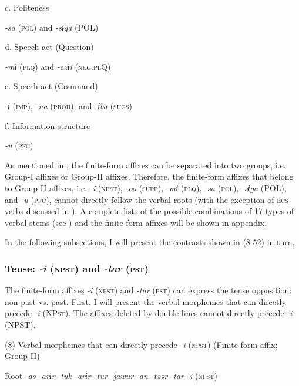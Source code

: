   c.  Politeness

    \textit{{}-sa} (\textsc{pol}) and \textit{{}-sɨga} (POL)

  d.  Speech act (Question)

    \textit{{}-mɨ} (\textsc{plq}) and \textit{{}-azɨi} (\textsc{neg}.\textsc{pl}Q)

  e.  Speech act (Command)

    \textit{{}-ɨ} (\textsc{imp}), \textit{{}-na} (\textsc{proh}), and \textit{{}-ɨba} (\textsc{sugs})

  f.  Information structure

    \textit{{}-u} (\textsc{pfc})

As mentioned in , the finite-form affixes can be separated into two groups, i.e. Group-I affixes or Group-II affixes. Therefore, the finite-form affixes that belong to Group-II affixes, i.e. \textit{{}-i} (\textsc{npst}), \textit{{}-oo} (\textsc{supp}), \textit{{}-mɨ} (\textsc{plq}), \textit{{}-sa} (\textsc{pol}), \textit{{}-sɨga} (POL), and \textit{{}-u} (\textsc{pfc}), cannot directly follow the verbal roots (with the exception of \textsc{ecs} verbs discussed in ). A complete lists of the possible combinations of 17 types of verbal stems (see ) and the finite-form affixes will be shown in appendix.

In the following subsections, I will present the contrasts shown in (8-52) in turn.

\subsubsection{Tense: \textit{{}-i} (\textsc{npst}) and \textit{{}-tar} (\textsc{pst})}

The finite-form affixes \textit{{}-i} (\textsc{npst}) and \textit{{}-tar} (\textsc{pst}) can express the tense opposition: non-past vs. past. First, I will present the verbal morphemes that can directly precede \textit{{}-i} (NP\textsc{st}). The affixes deleted by double lines cannot directly precede \textit{{}-i} (NPST).

(8)  Verbal morphemes that can directly precede \textit{{}-i} (\textsc{npst}) (Finite-form affix; Group II)

  Root  \textit{{}-as  {}-arɨr} %
\textit{{}-tuk  {}-arɨr  {}-tur  {}-jawur} %
\textit{{}-an  {}-təər  {}-tar  {}-i} (\textsc{npst})

